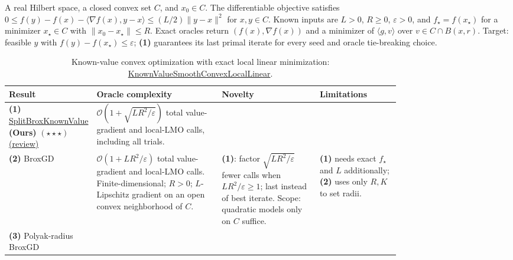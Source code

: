 \begin{table}[tp]
\centering
\caption{Known-value convex optimization with exact local linear minimization: \href{https://github.com/k3nfalt/longtails/blob/main/LongTails/Setups/KnownValueSmoothConvexLocalLinear.lean}{KnownValueSmoothConvexLocalLinear}.}\label{tab:KnownValueSmoothConvexLocalLinear}
\parbox{\linewidth}{\footnotesize A real Hilbert space, a closed convex set $C$, and $x_0\in C$. The differentiable objective satisfies $0\le f(y)-f(x)-\langle\nabla f(x),y-x\rangle\le (L/2)\|y-x\|^2$ for $x,y\in C$. Known inputs are $L>0$, $R\ge0$, $\varepsilon>0$, and $f_\star=f(x_\star)$ for a minimizer $x_\star\in C$ with $\|x_0-x_\star\|\le R$. Exact oracles return $(f(x),\nabla f(x))$ and a minimizer of $\langle g,v\rangle$ over $v\in C\cap B(x,r)$. Target: feasible $y$ with $f(y)-f(x_\star)\le\varepsilon$; \textbf{(1)} guarantees its last primal iterate for every seed and oracle tie-breaking choice.}\par\smallskip
\begin{threeparttable}
\footnotesize
\setlength{\tabcolsep}{4pt}\renewcommand{\arraystretch}{1.25}
\begin{tabularx}{\linewidth}{@{}>{\raggedright\arraybackslash}p{0.20\linewidth}>{\raggedright\arraybackslash}p{0.32\linewidth}>{\raggedright\arraybackslash}p{0.25\linewidth}>{\raggedright\arraybackslash}X@{}}
\toprule
\textbf{Result} & \textbf{Oracle complexity} & \textbf{Novelty} & \textbf{Limitations} \\
\midrule
\textbf{(1)} \href{https://github.com/k3nfalt/longtails/blob/main/LongTails/Theorems/SplitBroxKnownValue.lean}{Split\allowbreak Brox\allowbreak Known\allowbreak Value} \textbf{(Ours)} $(\star\star\star)$ \href{https://github.com/k3nfalt/longtails/blob/main/scripts/reviews/SplitBroxKnownValue.md}{(review)}
& $\mathcal{O}(1+\sqrt{LR^2/\varepsilon})$ total value-gradient and local-LMO calls, including all trials.
& & \\
\midrule[1.2pt]
\textbf{(2)} BroxGD \citep[Thm.~3.2(ii), Cor.~D.2]{kvBrox2026v2}
& $\mathcal{O}(1+LR^2/\varepsilon)$ total value-gradient and local-LMO calls. Finite-dimensional; $R>0$; $L$-Lipschitz gradient on an open convex neighborhood of $C$.
& \textbf{(1)}: factor $\sqrt{LR^2/\varepsilon}$ fewer calls when $LR^2/\varepsilon\ge1$; last instead of best iterate. Scope: quadratic models only on $C$ suffice.
& \textbf{(1)} needs exact $f_\star$ and $L$ additionally; \textbf{(2)} uses only $R,K$ to set radii. \\
\midrule
\textbf{(3)} Polyak-radius BroxGD \citep[Thm.~3.5, Eq.~(24)]{kvBrox2026v2}

\end{tabularx}
\end{threeparttable}
\end{table}
